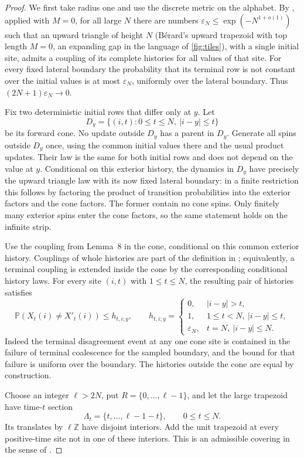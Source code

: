 \documentclass[11pt]{article}
\theoremstyle{plain}
\theoremstyle{definition}
\theoremstyle{remark}
\newcommand{\Z}{\mathbb{Z}}
\newcommand{\Prob}{\mathbb{P}}
\begin{document}
\begin{proof}
We first take radius one and use the discrete metric on the alphabet. By \cite[Lemma~8]{Berard23}, applied with $M=0$, for all large $N$ there are numbers $\varepsilon_N\le\exp(-N^{1+o(1)})$ such that an upward triangle of height $N$ (B\'erard's upward trapezoid with top length $M=0$, an expanding gap in the language of \cref{fig:tiles}), with a single initial site, admits a coupling of its complete histories for all values of that site. For every fixed lateral boundary the probability that its terminal row is not constant over the initial values is at most $\varepsilon_N$, uniformly over the lateral boundary. Thus $(2N+1)\varepsilon_N\to0$.

Fix two deterministic initial rows that differ only at $y$. Let
\[
 D_y=\{(i,t):0\le t\le N,\ |i-y|\le t\}
\]
be its forward cone. No update outside $D_y$ has a parent in $D_y$. Generate all spins outside $D_y$ once, using the common initial values there and the usual product updates. Their law is the same for both initial rows and does not depend on the value at $y$. Conditional on this exterior history, the dynamics in $D_y$ have precisely the upward triangle law with its now fixed lateral boundary: in a finite restriction this follows by factoring the product of transition probabilities into the exterior factors and the cone factors. The former contain no cone spins. Only finitely many exterior spins enter the cone factors, so the same statement holds on the infinite strip.

Use the coupling from Lemma~8 in the cone, conditional on this common exterior history. Couplings of whole histories are part of the definition in \cite[Section~3.2.2]{Berard23}; equivalently, a terminal coupling is extended inside the cone by the corresponding conditional history laws. For every site $(i,t)$ with $1\le t\le N$, the resulting pair of histories satisfies
\[
 \Prob(X_t(i)\ne X'_t(i))\le h_{t,i;y},\qquad
 h_{t,i;y}=
 \begin{cases}
  0,&|i-y|>t,\\
  1,&1\le t<N,\ |i-y|\le t,\\
  \varepsilon_N,&t=N,\ |i-y|\le N.
 \end{cases}
\]
Indeed the terminal disagreement event at any one cone site is contained in the failure of terminal coalescence for the sampled boundary, and the bound for that failure is uniform over the boundary. The histories outside the cone are equal by construction.

Choose an integer $\ell>2N$, put $R=\{0,\ldots,\ell-1\}$, and let the large trapezoid have time-$t$ section
\[
 \Lambda_t=\{t,\ldots,\ell-1-t\},\qquad 0\le t\le N.
\]
Its translates by $\ell\Z$ have disjoint interiors. Add the unit trapezoid at every positive-time site not in one of these interiors. This is an admissible covering in the sense of \cite[Definitions~1--2]{MS91}.


\end{proof}
\end{document}
